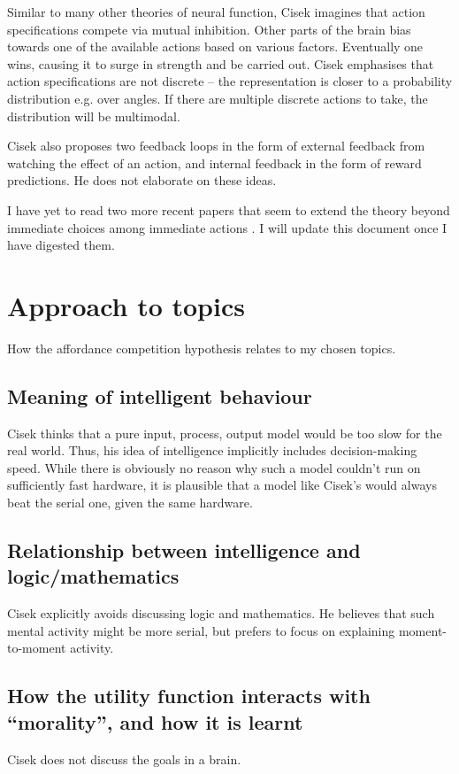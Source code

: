 \documentclass[10pt,a4paper]{article}
\newcommand{\nquote}[1]{``{#1}''}
\begin{document}
Similar to many other theories of neural function, Cisek imagines that action specifications compete via mutual inhibition. Other parts of the brain bias towards one of the available actions based on various factors. Eventually one wins, causing it to surge in strength and be carried out. Cisek emphasises that action specifications are not discrete -- the representation is closer to a probability distribution e.g. over angles. If there are multiple discrete actions to take, the distribution will be multimodal.

Cisek also proposes two feedback loops in the form of external feedback from watching the effect of an action, and internal feedback in the form of reward predictions. He does not elaborate on these ideas.

I have yet to read two more recent papers that seem to extend the theory beyond immediate choices among immediate actions \cite{cisek2012} \cite{cisek2016}. I will update this document once I have digested them.


\section{Approach to topics}
How the affordance competition hypothesis relates to my chosen topics.

\subsection{Meaning of intelligent behaviour}
Cisek thinks that a pure input, process, output model would be too slow for the real world. Thus, his idea of intelligence implicitly includes decision-making speed. While there is obviously no reason why such a model couldn't run on sufficiently fast hardware, it is plausible that a model like Cisek's would always beat the serial one, given the same hardware.

\subsection{Relationship between intelligence and logic/mathematics}
Cisek explicitly avoids discussing logic and mathematics. He believes that such mental activity might be more serial, but prefers to focus on explaining moment-to-moment activity.

\subsection{How the utility function interacts with \nquote{morality}, and how it is learnt}
Cisek does not discuss the goals in a brain.
\end{document}
